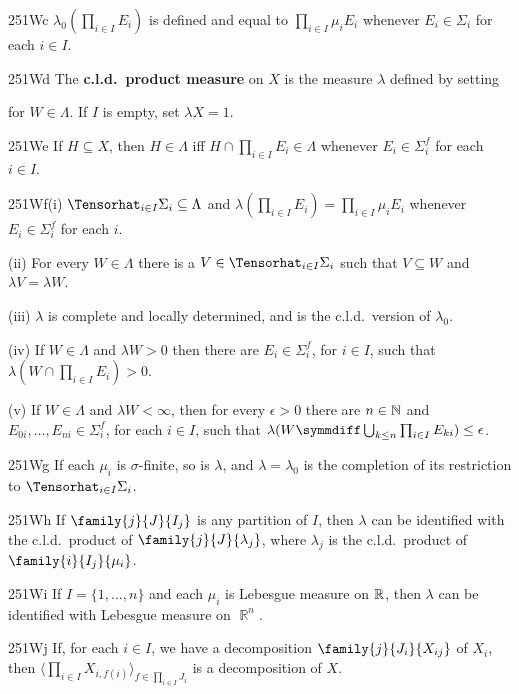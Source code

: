 \spheader 251Wc $\lambda_0(\prod_{i\in I}E_i)$ is defined and equal to
$\prod_{i\in I}\mu_iE_i$ whenever $E_i\in\Sigma_i$ for each $i\in I$.

\spheader 251Wd The {\bf c.l.d.\ product measure} on $X$ is the measure
$\lambda$ defined by setting


\noindent for $W\in\Lambda$.   If $I$ is empty,  set
$\lambda X=1$.

\spheader 251We If $H\subseteq X$, then $H\in\Lambda$ iff
$H\cap\prod_{i\in I}E_i\in\Lambda$ whenever $E_i\in\Sigma_i^f$ for each
$i\in I$.

\spheader 251Wf(i) $\Tensorhat_{i\in I}\Sigma_i\subseteq\Lambda$ and
$\lambda(\prod_{i\in I}E_i)=\prod_{i\in I}\mu_iE_i$ whenever
$E_i\in\Sigma_i^f$ for each $i$.

\quad(ii) For every $W\in\Lambda$ there is a $V\in\Tensorhat_{i\in
I}\Sigma_i$ such that $V\subseteq W$ and $\lambda V=\lambda W$.

\quad(iii) $\lambda$ is complete and locally determined, and is the
c.l.d.\ version of $\lambda_0$.

\quad(iv) If $W\in\Lambda$ and $\lambda W>0$ then there are
$E_i\in\Sigma_i^f$, for $i\in I$, such that
$\lambda(W\cap\prod_{i\in I}E_i)>0$.

\quad(v) If $W\in\Lambda$ and $\lambda W<\infty$, then for every
$\epsilon>0$ there are $n\in\Bbb N$ and
$E_{0i},\ldots,E_{ni}\in\Sigma_i^f$, for each $i\in I$, such that
$\lambda(W\symmdiff\bigcup_{k\le n}\prod_{i\in I}E_{ki})\le\epsilon$.

\spheader 251Wg If each $\mu_i$ is $\sigma$-finite, so is $\lambda$, and
$\lambda=\lambda_0$ is the completion of its restriction to
$\Tensorhat_{i\in I}\Sigma_i$.

\spheader 251Wh If $\family{j}{J}{I_j}$ is any partition of $I$, then
$\lambda$ can be identified with the c.l.d.\ product of
$\family{j}{J}{\lambda_j}$, where $\lambda_j$ is the c.l.d.\ product of
$\family{i}{I_j}{\mu_i}$.   

\spheader 251Wi If $I=\{1,\ldots,n\}$ and each $\mu_i$ is Lebesgue
measure on $\Bbb R$, then $\lambda$ can be identified with Lebesgue
measure on $\BbbR^n$.

\spheader 251Wj If, for each $i\in I$, we have a decomposition
$\family{j}{J_i}{X_{ij}}$ of $X_i$, then
$\langle\prod_{i\in I}X_{i,f(i)}\rangle_{f\in\prod_{i\in I}J_i}$ is a
decomposition of $X$.

